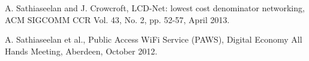\documentclass[conference]{IEEEtran}
\begin{document}
%
%
\begin{thebibliography}{15}








A. Sathiaseelan and J. Crowcroft, LCD-Net: lowest cost denominator networking, ACM SIGCOMM CCR Vol. 43, No. 2,  pp. 52-57, April 2013.

A. Sathiaseelan et al., Public Access WiFi Service (PAWS), Digital Economy All Hands Meeting, Aberdeen, October 2012.






\end{thebibliography}
\end{document}

